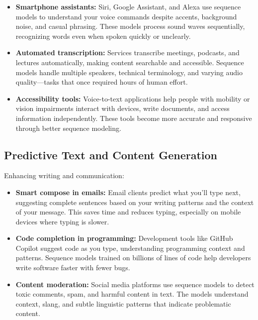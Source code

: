 \begin{itemize}
    \item \textbf{Smartphone assistants:} Siri, Google Assistant, and Alexa use sequence models to understand your voice commands despite accents, background noise, and casual phrasing. These models process sound waves sequentially, recognizing words even when spoken quickly or unclearly.
    
    \item \textbf{Automated transcription:} Services transcribe meetings, podcasts, and lectures automatically, making content searchable and accessible. Sequence models handle multiple speakers, technical terminology, and varying audio quality—tasks that once required hours of human effort.
    
    \item \textbf{Accessibility tools:} Voice-to-text applications help people with mobility or vision impairments interact with devices, write documents, and access information independently. These tools become more accurate and responsive through better sequence modeling.
\end{itemize}

\subsection{Predictive Text and Content Generation}

Enhancing writing and communication:

\begin{itemize}
    \item \textbf{Smart compose in emails:} Email clients predict what you'll type next, suggesting complete sentences based on your writing patterns and the context of your message. This saves time and reduces typing, especially on mobile devices where typing is slower.
    
    \item \textbf{Code completion in programming:} Development tools like GitHub Copilot suggest code as you type, understanding programming context and patterns. Sequence models trained on billions of lines of code help developers write software faster with fewer bugs.
    
    \item \textbf{Content moderation:} Social media platforms use sequence models to detect toxic comments, spam, and harmful content in text. The models understand context, slang, and subtle linguistic patterns that indicate problematic content.
\end{itemize}

